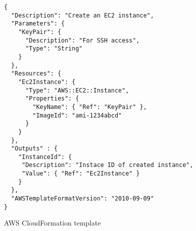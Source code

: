 \begin{figure}
  \begin{center}
    \begin{verbatim}
{
  "Description": "Create an EC2 instance",
  "Parameters": {
    "KeyPair": {
      "Description": "For SSH access",
      "Type": "String"
    }
  },
  "Resources": {
    "Ec2Instance": {
      "Type": "AWS::EC2::Instance",
      "Properties": {
        "KeyName": { "Ref": "KeyPair" },
        "ImageId": "ami-1234abcd" 
      }
    }
  },
  "Outputs" : {
    "InstanceId": {
     "Description": "Instace ID of created instance",
     "Value": { "Ref": "Ec2Instance" }
    }
  },
  "AWSTemplateFormatVersion": "2010-09-09"
}
    \end{verbatim}
  \end{center}
  \caption{AWS CloudFormation template}
  \label{fig:cloudformation-template}
\end{figure}

